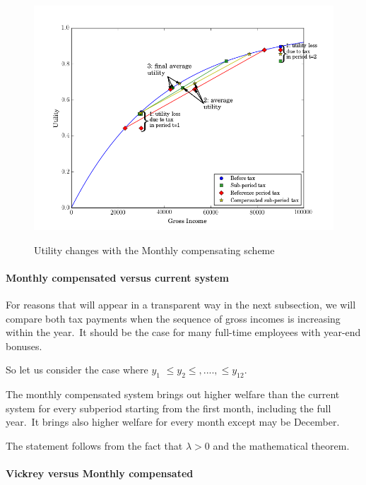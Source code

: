 \begin{figure}[ptb]
\caption{Utility changes with the Monthly compensating scheme}%
\label{Utility side}
{\centering\includegraphics[width=1.0\textwidth]{image_graph3.png}}
\end{figure}

\paragraph{Monthly compensated versus current system}

For reasons that will appear in a transparent way in the next subsection, we
will compare both tax payments when the sequence of gross incomes is
increasing within the year.\ It should be the case for many full-time
employees with year-end bonuses.\ 

So let us consider the case where $y_{1}$ $\leq y_{2}\leq,....,\leq y_{12}.$

\begin{claim}
The monthly compensated system brings out higher welfare than the current
system for every subperiod starting from the first month, including the full
year.\ It brings also higher welfare for every month except may be December.
\end{claim}

The statement follows from the fact that $\lambda>0$ and the mathematical theorem.\ 

\paragraph{Vickrey versus Monthly compensated}

